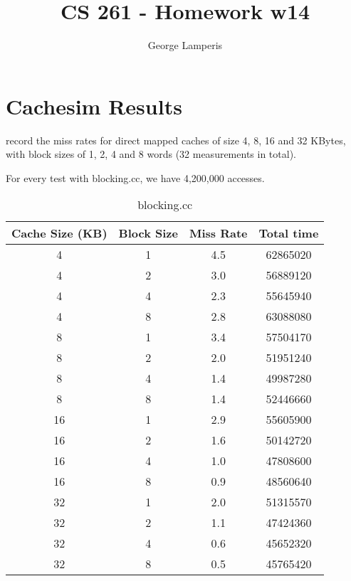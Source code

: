 \documentclass[letterpaper, 12pt, oneside]{memoir}
\title{CS 261 - Homework w14}
\author{George Lamperis}
\date{}
\begin{document}
\maketitle

\section{Cachesim Results}
record the miss rates for direct mapped caches of size 4, 8, 16 and 32 KBytes,
with block sizes of 1, 2, 4 and 8 words (32 measurements in total). 

For every test with blocking.cc, we have 4,200,000 accesses.
\begin{table}[H]
\centering
\begin{tabular}{c|c|c|c}
    Cache Size (KB)  & Block Size & Miss Rate & Total time \\ \hline 
    4  & 1 & 4.5    & 62865020 \\
    4  & 2 & 3.0    & 56889120 \\
    4  & 4 & 2.3    & 55645940 \\
    4  & 8 & 2.8    & 63088080 \\ \hline
    8  & 1 & 3.4    & 57504170 \\
    8  & 2 & 2.0    & 51951240 \\
    8  & 4 & 1.4    & 49987280 \\
    8  & 8 & 1.4    & 52446660 \\ \hline
    16 & 1 & 2.9    & 55605900 \\
    16 & 2 & 1.6    & 50142720 \\
    16 & 4 & 1.0    & 47808600 \\
    16 & 8 & 0.9    & 48560640 \\ \hline
    32 & 1 & 2.0    & 51315570 \\
    32 & 2 & 1.1    & 47424360 \\
    32 & 4 & 0.6    & 45652320 \\
    32 & 8 & 0.5    & 45765420 \\
\end{tabular}
\caption{blocking.cc}
\end{table}
\end{document}
